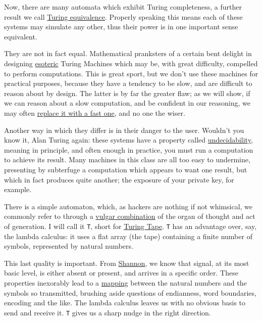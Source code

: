 \documentclass[twoside]{article}
\begin{document}
Now, there are many automata which exhibit Turing completeness, a further result we call \href{https://en.wikipedia.org/wiki/Turing_equivalence}{Turing equivalence}. Properly speaking this means each of these systems may simulate any other, thus their power is in one important sense equivalent.

They are not in fact equal. Mathematical pranksters of a certain bent delight in designing \href{https://esolangs.org/wiki/Ax}{esoteric} Turing Machines which may be, with great difficulty, compelled to perform computations. This is great sport, but we don't use these machines for practical purposes, because they have a tendency to be slow, and are difficult to reason about by design. The latter is by far the greater flaw; as we will show, if we can reason about a slow computation, and be confident in our reasoning, we may often \href{https://en.wikipedia.org/wiki/Rewriting}{replace it with a fast one}, and no one the wiser.

Another way in which they differ is in their danger to the user. Wouldn't you know it, Alan Turing again: these systems have a property called \href{https://en.wikipedia.org/wiki/Undecidable_problem}{undecidability}, meaning in principle, and often enough in practice, you must run a computation to achieve its result. Many machines in this class are all too easy to undermine, presenting by subterfuge a computation which appears to want one result, but which in fact produces quite another; the exposure of your private key, for example.

There is a simple automaton, which, as hackers are nothing if not whimsical, we commonly refer to through a \href{https://en.wikipedia.org/wiki/Brainfuck}{vulgar combination} of the organ of thought and act of generation. I will call it \texttt{T}, short for \href{https://en.wikipedia.org/wiki/Turing_machine}{Turing Tape}. \texttt{T} has an advantage over, say, the lambda calculus: it uses a flat array (the tape) containing a finite number of symbols, represented by natural numbers.

This last quality is important. From \href{https://en.wikipedia.org/wiki/Claude_Shannon}{Shannon}, we know that signal, at its most basic level, is either absent or present, and arrives in a specific order. These properties inexorably lead to a \href{https://en.wikipedia.org/wiki/Bijection}{mapping} between the natural numbers and the symbols so transmitted, brushing aside questions of endianness, word boundaries, encoding and the like. The lambda calculus leaves us with no obvious basis to send and receive it. \texttt{T} gives us a sharp nudge in the right direction.
\end{document}
